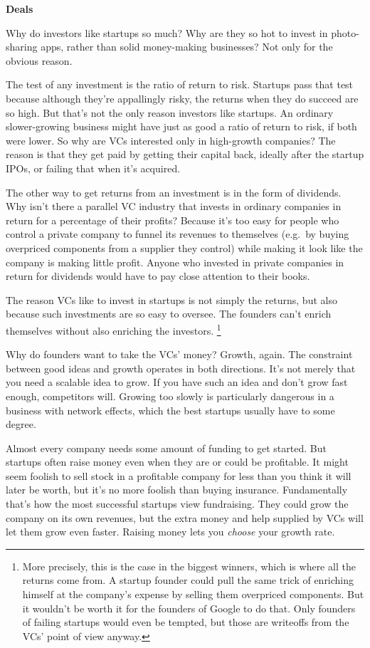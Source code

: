 \documentclass[12pt]{book}
\begin{document}
\textbf{Deals}

Why do investors like startups so much? Why are they so hot to invest in
photo-sharing apps, rather than solid money-making businesses? Not only
for the obvious reason.

The test of any investment is the ratio of return to risk. Startups pass
that test because although they're appallingly risky, the returns when
they do succeed are so high. But that's not the only reason investors
like startups. An ordinary slower-growing business might have just as
good a ratio of return to risk, if both were lower. So why are VCs
interested only in high-growth companies? The reason is that they get
paid by getting their capital back, ideally after the startup IPOs, or
failing that when it's acquired.

The other way to get returns from an investment is in the form of
dividends. Why isn't there a parallel VC industry that invests in
ordinary companies in return for a percentage of their profits? Because
it's too easy for people who control a private company to funnel its
revenues to themselves (e.g.~by buying overpriced components from a
supplier they control) while making it look like the company is making
little profit. Anyone who invested in private companies in return for
dividends would have to pay close attention to their books.

The reason VCs like to invest in startups is not simply the returns, but
also because such investments are so easy to oversee. The founders can't
enrich themselves without also enriching the investors.
\footnote{More precisely, this is the case in the biggest winners, which
is where all the returns come from. A startup founder could pull the
same trick of enriching himself at the company's expense by selling them
overpriced components. But it wouldn't be worth it for the founders of
Google to do that. Only founders of failing startups would even be
tempted, but those are writeoffs from the VCs' point of view anyway.}

Why do founders want to take the VCs' money? Growth, again. The
constraint between good ideas and growth operates in both directions.
It's not merely that you need a scalable idea to grow. If you have such
an idea and don't grow fast enough, competitors will. Growing too slowly
is particularly dangerous in a business with network effects, which the
best startups usually have to some degree.

Almost every company needs some amount of funding to get started. But
startups often raise money even when they are or could be profitable. It
might seem foolish to sell stock in a profitable company for less than
you think it will later be worth, but it's no more foolish than buying
insurance. Fundamentally that's how the most successful startups view
fundraising. They could grow the company on its own revenues, but the
extra money and help supplied by VCs will let them grow even faster.
Raising money lets you \emph{choose} your growth rate.
\end{document}
